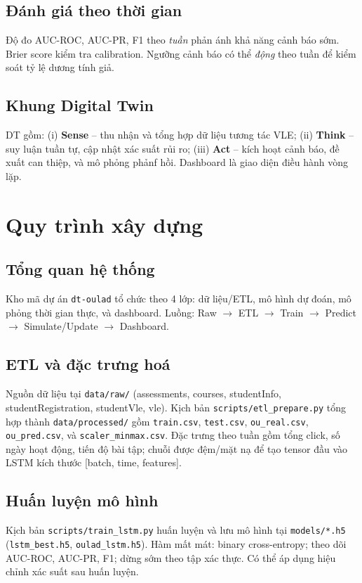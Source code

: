 \documentclass[12pt,a4paper]{article}
\newcommand{\proj}{dt-oulad}
\begin{document}
\subsection{Đánh giá theo thời gian}
Độ đo AUC-ROC, AUC-PR, F1 theo \emph{tuần} phản ánh khả năng cảnh báo sớm. Brier score kiểm tra calibration. Ngưỡng cảnh báo có thể \emph{động} theo tuần để kiểm soát tỷ lệ dương tính giả.

\subsection{Khung Digital Twin}
DT gồm: (i) \textbf{Sense} -- thu nhận và tổng hợp dữ liệu tương tác VLE; (ii) \textbf{Think} -- suy luận tuần tự, cập nhật xác suất rủi ro; (iii) \textbf{Act} -- kích hoạt cảnh báo, đề xuất can thiệp, và mô phỏng phảnf hồi. Dashboard là giao diện điều hành vòng lặp.

\section{Quy trình xây dựng}
\subsection{Tổng quan hệ thống}
Kho mã dự án \texttt{\proj} tổ chức theo 4 lớp: dữ liệu/ETL, mô hình dự đoán, mô phỏng thời gian thực, và dashboard. Luồng: Raw $\rightarrow$ ETL $\rightarrow$ Train $\rightarrow$ Predict $\rightarrow$ Simulate/Update $\rightarrow$ Dashboard.

\subsection{ETL và đặc trưng hoá}
Nguồn dữ liệu tại \texttt{data/raw/} (assessments, courses, studentInfo, studentRegistration, studentVle, vle). Kịch bản \texttt{scripts/etl\_prepare.py} tổng hợp thành \texttt{data/processed/} gồm \texttt{train.csv}, \texttt{test.csv}, \texttt{ou\_real.csv}, \texttt{ou\_pred.csv}, và \texttt{scaler\_minmax.csv}. Đặc trưng theo tuần gồm tổng click, số ngày hoạt động, tiến độ bài tập; chuỗi được đệm/mặt nạ để tạo tensor đầu vào LSTM kích thước [batch, time, features].

\subsection{Huấn luyện mô hình}
Kịch bản \texttt{scripts/train\_lstm.py} huấn luyện và lưu mô hình tại \texttt{models/*.h5} (\texttt{lstm\_best.h5}, \texttt{oulad\_lstm.h5}). Hàm mất mát: binary cross-entropy; theo dõi AUC-ROC, AUC-PR, F1; dừng sớm theo tập xác thực. Có thể áp dụng hiệu chỉnh xác suất sau huấn luyện.
\end{document}
